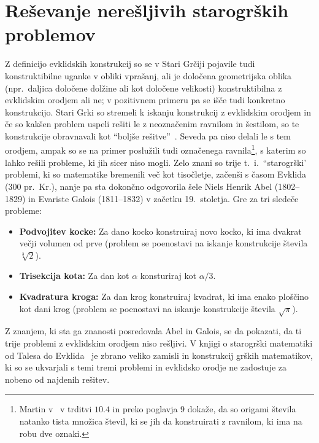 \section{Reševanje nerešljivih starogrških problemov}
\label{pogl:starogrskiproblemi}

Z definicijo evklidskih konstrukcij so se v Stari Grčiji pojavile tudi konstruktibilne uganke v obliki vprašanj, ali je določena geometrijska oblika (npr.\ daljica določene dolžine ali kot določene velikosti) konstruktibilna z evklidskim orodjem ali ne; v pozitivnem primeru pa se išče tudi konkretno konstrukcijo. Stari Grki so stremeli k iskanju konstrukcij z evklidskim orodjem in če so kakšen problem uspeli rešiti le z neoznačenim ravnilom in šestilom, so te konstrukcije obravnavali kot ``boljše rešitve''~\cite[str. 36]{royster2002}. Seveda pa niso delali le s tem orodjem, ampak so se na primer poslužili tudi označenega ravnila\footnote{Martin v~\cite{geometricconstructions} v trditvi $10.4$ in preko poglavja $9$ dokaže, da so origami števila natanko tista množica števil, ki se jih da konstruirati z ravnilom, ki ima na robu dve oznaki.}, s katerim so lahko rešili probleme, ki jih sicer niso mogli. Zelo znani so trije t.~i.\ ``starogrški' problemi, ki so matematike bremenili več kot tisočletje, začenši s časom Evklida (300 pr.\ Kr.), nanje pa sta dokončno odgovorila šele Niels Henrik Abel (1802--1829) in Evariste Galois (1811--1832) v začetku 19.\ stoletja. Gre za tri sledeče probleme:
\begin{itemize}
    \item \textbf{Podvojitev kocke:} Za dano kocko konstruiraj novo kocko, ki ima dvakrat večji volumen od prve (problem se poenostavi na iskanje konstrukcije števila $\sqrt[3]{2}$).
    \item \textbf{Trisekcija kota:} Za dan kot $\alpha$ konsturiraj kot $\alpha/3$.
    \item \textbf{Kvadratura kroga:} Za dan krog konstruiraj kvadrat, ki ima enako ploščino kot dani krog (problem se poenostavi na iskanje konstrukcije števila $\sqrt{\pi}$).
\end{itemize}

Z znanjem, ki sta ga znanosti posredovala Abel in Galois, se da pokazati, da ti trije problemi z evklidskim orodjem niso rešljivi. V knjigi o starogrški matematiki od Talesa do Evklida~\cite[str.\ 218--270]{heath1921} je zbrano veliko zamisli in konstrukcij grških matematikov, ki so se ukvarjali s temi tremi problemi in evklidsko orodje ne zadostuje za nobeno od najdenih rešitev.

